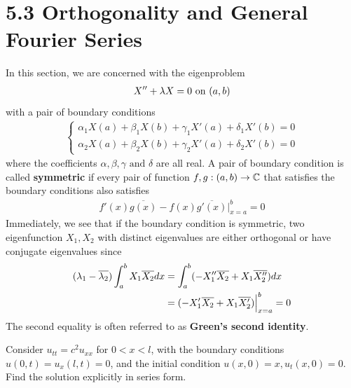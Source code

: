 \documentclass{report}
\begin{document}
\section{5.3 Orthogonality and General Fourier Series} 
\begin{mdframed}
In this section, we are concerned with the eigenproblem 
\begin{align*}
X''+\lambda  X= 0\text{ on }(a,b)
\end{align*}
with a pair of boundary conditions 
\begin{align*}
\begin{cases}
  \alpha_1 X(a)+ \beta _1 X(b)+ \gamma_1 X'(a)+ \delta_1 X'(b)=0 \\
  \alpha_2 X(a) + \beta _2 X(b)+ \gamma _2 X'(a)+ \delta_2 X'(b)=0
\end{cases}
\end{align*}
where the coefficients $\alpha ,\beta ,\gamma\text{ and }\delta$ are all real. A pair of boundary condition is called \textbf{symmetric} if every pair of function $f,g:(a,b)\rightarrow \mathbb{C}$ that satisfies the boundary conditions also satisfies   
\begin{align*}
  f'(x)\overline{g(x)}-f(x)\overline{g'(x)} \Big|_{x=a}^b =0
\end{align*}
Immediately, we see that if the boundary condition is symmetric, two eigenfunction $X_1,X_2$ with distinct eigenvalues are either orthogonal or have conjugate eigenvalues since 
 \begin{align*}
   (\lambda _1- \overline{\lambda _2})\int_a^b X_1  \overline{X_2} dx&= \int_a^b (-X_1''\overline{ X_2}+ X_1\overline{X_2''})dx \\
                                                                      &= (-X_1'\overline{X_2}+X_1\overline{X_2'})\Big|_{x=a}^b=0
\end{align*}
The second equality is often referred to as \textbf{Green's second identity}. 
\end{mdframed}
\begin{question}{}{}
Consider $u_{tt}=c^2 u_{xx}$ for $0<x<l$, with the boundary conditions  $u (0,t)=u_x(l,t)=0$, and the initial condition $u(x,0)=x,u_t(x,0)=0$. Find the solution explicitly in series form. 
\end{question}
\end{document}
